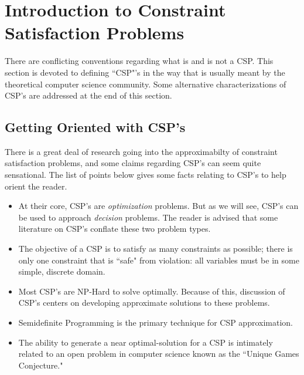 %


\section{Introduction to Constraint Satisfaction Problems}\label{sec:introToCSP}
There are conflicting conventions regarding what is and is not a CSP. This section is devoted to defining ``CSP"'s in the way that is usually meant by the theoretical computer science community. Some alternative characterizations of CSP's are addressed at the end of this section. 
\subsection{Getting Oriented with CSP's}

There is a great deal of research going into the approximabilty of constraint satisfaction problems, and some claims regarding CSP's can seem quite sensational. 
The list of points below gives some facts relating to CSP's to help orient the reader.

\begin{itemize}
\item At their core, CSP's are \textit{optimization} problems. But as we will see, CSP's can be used to approach \textit{decision} problems. The reader is advised that some literature on CSP's conflate these two problem types.
\item The objective of a CSP is to satisfy as many constraints as possible; there is only one constraint that is ``safe" from violation: all variables must be in some simple, discrete domain.
\item Most CSP's are NP-Hard to solve optimally. Because of this, discussion of CSP's centers on developing approximate solutions to these problems.
\item Semidefinite Programming is the primary technique for CSP approximation.
\item The ability to generate a near optimal-solution for a CSP is intimately related to an open problem in computer science known as the ``Unique Games Conjecture."
\end{itemize}

